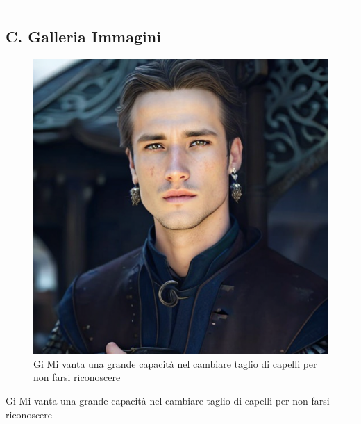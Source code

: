 \begin{center}\rule{0.5\linewidth}{0.5pt}\end{center}

\href{Untitled\%20e444802359d547a8adcf33286185100d.csv}{}

\subsection{C. Galleria Immagini}\label{c.-galleria-immagini}

\begin{figure}
\centering
\includegraphics{a-fantasy-male-character-set-in-medieval-market-.png}
\caption{Gi Mi vanta una grande capacità nel cambiare taglio di capelli
per non farsi riconoscere}
\end{figure}

Gi Mi vanta una grande capacità nel cambiare taglio di capelli per non
farsi riconoscere
